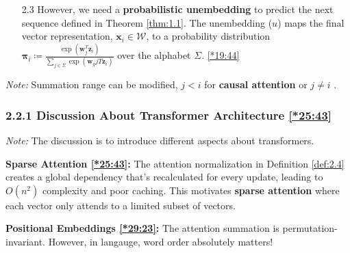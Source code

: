 \documentclass[12pt, twoside]{article}
\begin{document}
\begin{definition}
\begin{enumerate}
\begin{enumerate}
\item[{2.3}] However, we need a \textbf{probabilistic unembedding} to predict the next sequence defined in Theorem \ref{thm:1.1}. The unembedding ($u$) maps the final vector representation, $\mathbf{x}_i \in \mathcal{W}$, to a probability distribution $\mathbf{\pi}_i \coloneqq\frac{\exp(\mathbf{w}_{j}^T \mathbf{z}_i)}{\sum_{j \in \Sigma} \exp(\mathbf{w}_{g}jT \mathbf{z}_i)}$ over the alphabet $\Sigma$. \href{https://youtu.be/1u6h3Nm3NvM?si=le_Dg2Rl3Kr4Mv3s&t=1184}{[*19:44]}

    \end{enumerate}
\end{enumerate}
\textit{Note:} Summation range can be modified, $j < i$ for \textbf{causal attention} or $j \neq i$ .
\end{definition}

\subsubsection*{2.2.1 Discussion About Transformer Architecture \href{https://youtu.be/1u6h3Nm3NvM?si=cJQ1smjRAK88W2C7&t=1543}{[*25:43]}}

\textit{Note:} The discussion is to introduce different aspects about transformers.

\textbf{Sparse Attention \href{https://youtu.be/1u6h3Nm3NvM?si=cJQ1smjRAK88W2C7&t=1543}{[*25:43]}:} The attention normalization in Definition \ref{def:2.4} creates a global dependency that's recalculated for every update, leading to $O(n^2)$ complexity and poor caching. This motivates \textbf{sparse attention} where each vector only attends to a limited subset of vectors.

\textbf{Positional Embeddings \href{https://youtu.be/1u6h3Nm3NvM?si=MPObGmLgx7i59976&t=1763}{[*29:23]}:} The attention summation is permutation-invariant. However, in langauge, word order absolutely matters!
\end{document}
